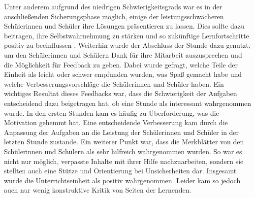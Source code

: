 Unter anderem aufgrund des niedrigen Schwierigkeitsgrads war es in der anschließenden Sicherungsphase möglich, einige der leistungsschwächeren Schülerinnen und Schüler ihre Lösungen präsentieren zu lassen.
Dies sollte dazu beitragen, ihre Selbstwahrnehmung zu stärken und so zukünftige Lernfortschritte positiv zu beeinflussen \cite{marsh2008reciprocal}.
Weiterhin wurde der Abschluss der Stunde dazu genutzt, um den Schülerinnen und Schülern Dank für ihre Mitarbeit auszusprechen und die Möglichkeit für Feedback zu geben.
Dabei wurde gefragt, welche Teile der Einheit als leicht oder schwer empfunden wurden, was Spaß gemacht habe und welche Verbesserungsvorschläge die Schülerinnen und Schüler haben.
Ein wichtiges Resultat dieses Feedbacks war, dass die Schwierigkeit der Aufgaben entscheidend dazu beigetragen hat, ob eine Stunde als interessant wahrgenommen wurde.
In den ersten Stunden kam es häufig zu Überforderung, was die Motivation gehemmt hat.
Eine entscheidende Verbesserung kam durch die Anpassung der Aufgaben an die Leistung der Schülerinnen und Schüler in der letzten Stunde zustande.
Ein weiterer Punkt war, dass die Merkblätter von den Schülerinnen und Schülern als sehr hilfreich wahrgenommen wurden.
So war es nicht nur möglich, verpasste Inhalte mit ihrer Hilfe nachzuarbeiten, sondern sie stellten auch eine Stütze und Orientierung bei Unsicherheiten dar.
Insgesamt wurde die Unterrichtseinheit als positiv wahrgenommen.
Leider kam so jedoch auch nur wenig konstruktive Kritik von Seiten der Lernenden.